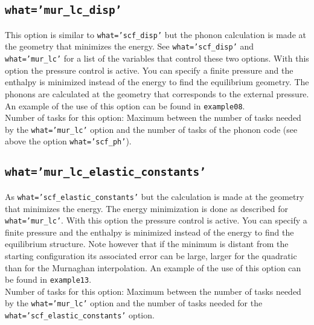 \documentclass[12pt,a4paper]{article}
\begin{document}
\subsection{\color{web-blue}\texttt{what='mur\_lc\_disp'}}
This option is similar to \texttt{what='scf\_disp'} but the phonon calculation
is made at the geometry that minimizes the energy.
See \texttt{what='scf\_disp'} and \texttt{what='mur\_lc'} for a
list of the variables that control these two options. 
With this option the pressure control is active. You can specify a
finite pressure and the enthalpy is minimized instead of the
energy to find the equilibrium geometry. The phonons are calculated
at the geometry that corresponds to the external pressure.
An example of the use of this option can be found in \texttt{example08}. \\
Number of tasks for this option: Maximum between the number of tasks  
needed by the \texttt{what='mur\_lc'} option and the number
of tasks of the phonon code (see above the option \texttt{what='scf\_ph'}).

\subsection{\color{web-blue}\texttt{what='mur\_lc\_elastic\_constants'}}
As \texttt{what='scf\_elastic\_constants'} but the calculation is made at the
geometry that minimizes the energy. The energy minimization is 
done as described for \texttt{what='mur\_lc'}. 
With this option the pressure control is active. You can specify a
finite pressure and the enthalpy is minimized instead of the
energy to find the equilibrium structure. Note however that if the 
minimum is distant from the starting configuration its associated error 
can be large, larger for the quadratic than for the Murnaghan interpolation. 
An example of the use of this 
option can be found in \texttt{example13}. \\
Number of tasks for this option: Maximum between the number of tasks
needed by the \texttt{what='mur\_lc'} option and the number of tasks
needed for the \texttt{what='scf\_elastic\_constants'} option.

\end{document}
